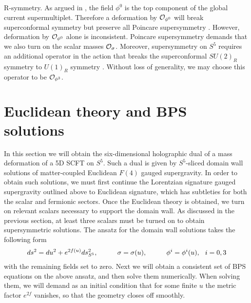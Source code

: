 \documentclass[12pt]{article}
\begin{document}
 R-symmetry. As argued in , the field $\phi^0$ is the top component of the global current supermultiplet. Therefore a deformation by ${\cal O}_{\phi^0}$ will break superconformal symmetry but preserve all Poincare supersymmetry . However, deformation by ${\cal O}_{\phi^0}$ alone is inconsistent. Poincare supersymmetry demands that we also turn on the scalar masses ${\cal O}_{\sigma}$. Moreover, supersymmetry on $S^5$ requires an additional operator in the action that breaks the superconformal $SU(2)_R$ symmetry to $U(1)_R$ symmetry . Without loss of generality, we may choose this operator to be ${\cal O}_{\phi^3}$.
\section{Euclidean theory and BPS solutions}
\setcounter{equation}{0}
In this section we will obtain the six-dimensional holographic dual of a mass deformation of a 5D SCFT on $S^5$. Such a dual is given by $S^5$-sliced domain wall solutions of matter-coupled Euclidean $F(4)$ gauged supergravity. In order to obtain such solutions, we must first continue the Lorentzian signature gauged supergravity outlined above to Euclidean signature, which has subtleties for both the scalar and fermionic sectors. Once the Euclidean theory is obtained, we turn on relevant scalars necessary to support the domain wall. As discussed in the previous section, at least three scalars must be turned on to obtain supersymmetric solutions. The ansatz for the domain wall solutions takes the following form
\begin{eqnarray}
ds^2 = du^2 + e^{2f(u)} ds_{S^5}^2,\hspace{0.4in} \sigma=\sigma(u),\hspace{0.4in}  \phi^i=\phi^i(u), \hspace{0.1 in}i=0 ,3
\end{eqnarray}
with the remaining fields set to zero. Next we will obtain a consistent set of BPS equations on  the above ansatz, and then solve them numerically. When solving them, we will demand as an initial condition that for some finite $u$ the metric factor $e^{2f}$ vanishes, so that the geometry closes off smoothly.
\end{document}
